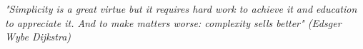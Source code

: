 \begin{epigrafe}
    \vspace*{\fill}
	\begin{flushright}
		\textit{
		"Simplicity is a great virtue but it requires hard work to achieve it and education to appreciate it. And to make matters worse: complexity sells better" (Edsger Wybe Dijkstra)}
	\end{flushright}
\end{epigrafe}